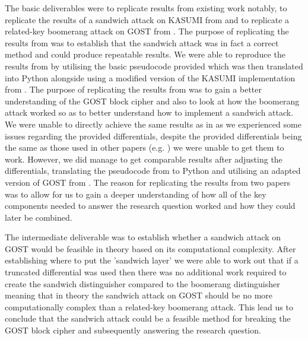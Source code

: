 \documentclass[10pt,journal,compsoc]{IEEEtran}
\begin{document}
The basic deliverables were to replicate results from existing work notably, to replicate the results of a sandwich attack on KASUMI from \cite{jofc-2014-25962} and to replicate a related-key boomerang attack on GOST from \cite{cryptoeprint:2010/111}. The purpose of replicating the results from \cite{jofc-2014-25962} was to establish that the sandwich attack was in fact a correct method and could produce repeatable results. We were able to reproduce the results from \cite{jofc-2014-25962} by utilising the basic pseudocode provided \cite{jofc-2014-25962} which was then translated into Python alongside using a modified version of the KASUMI implementation from \cite{asecuritysite_82320}. The purpose of replicating the results from \cite{cryptoeprint:2010/111} was to gain a better understanding of the GOST block cipher and also to look at how the boomerang attack worked so as to better understand how to implement a sandwich attack. We were unable to directly achieve the same results as in \cite{cryptoeprint:2010/111} as we experienced some issues regarding the provided differentials, despite the provided differentials being the same as those used in other papers (e.g. \cite{inproceedings}) we were unable to get them to work. However, we did manage to get comparable results after adjusting the differentials, translating the pseudocode from \cite{cryptoeprint:2010/111} to Python and utilising an adapted version of GOST from \cite{githubGitHubBozhuGOSTPython}. The reason for replicating the results from two papers was to allow for us to gain a deeper understanding of how all of the key components needed to answer the research question worked and how they could later be combined.

The intermediate deliverable was to establish whether a sandwich attack on GOST would be feasible in theory based on its computational complexity. After establishing where to put the 'sandwich layer' we were able to work out that if a truncated differential was used then there was no additional work required to create the sandwich distinguisher compared to the boomerang distinguisher meaning that in theory the sandwich attack on GOST should be no more computationally complex than a related-key boomerang attack. This lead us to conclude that the sandwich attack could be a feasible method for breaking the GOST block cipher and subsequently answering the research question.
\end{document}
